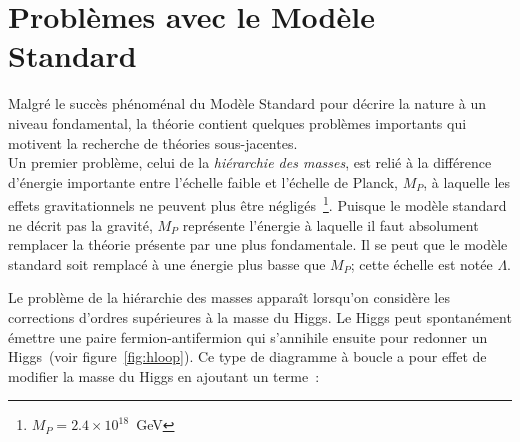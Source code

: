 



\section{Problèmes avec le Modèle Standard}
\label{sec:ms:problemes}

Malgré le succès phénoménal du Modèle Standard pour décrire la nature
à un niveau fondamental, la théorie contient quelques problèmes
importants qui motivent la recherche de théories sous-jacentes. \\

Un premier problème, celui de la \emph{hiérarchie des masses}, est
relié à la différence d'énergie importante entre l'échelle faible et
l'échelle de Planck, $M_P$, à laquelle les effets gravitationnels ne
peuvent plus être négligés~\footnote{$M_P = 2.4 \times 10^{18}$~GeV}. Puisque le modèle standard ne décrit pas la gravité,
$M_P$ représente l'énergie à laquelle il faut absolument remplacer la
théorie présente par une plus fondamentale. Il se peut que le modèle standard soit
remplacé à une énergie plus basse que $M_P$; cette échelle est notée $\Lambda$.

Le problème de la hiérarchie des masses apparaît lorsqu'on considère
les corrections d'ordres supérieures à la masse du Higgs. Le Higgs peut
spontanément émettre une paire fermion-antifermion qui s'annihile
ensuite pour redonner un Higgs~(voir figure~\ref{fig:hloop}). Ce type de diagramme à boucle a pour
effet de modifier la masse du Higgs en ajoutant un terme~\cite{martin_supersymmetry_1997}:

